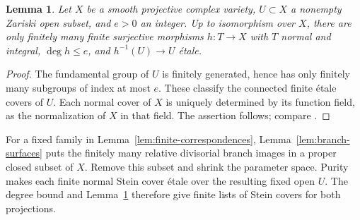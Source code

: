 \documentclass[12pt,a4paper,psamsfonts]{amsart}
\theoremstyle{definition}
\theoremstyle{plain}
\newtheorem{lemma}{Lemma}[section]
\begin{document}
\begin{lemma}\label{lem:finite-stein-covers}
Let $X$ be a smooth projective complex variety, $U\subset X$ a
nonempty Zariski open subset, and $e>0$ an integer. Up to isomorphism
over $X$, there are only finitely many finite surjective morphisms
$h:T\to X$ with $T$ normal and integral, $\deg h\le e$, and
$h^{-1}(U)\to U$ \'etale.
\end{lemma}
\begin{proof}
The fundamental group of $U$ is finitely generated, hence has
only finitely many subgroups of index at most $e$. These classify
the connected finite \'etale covers of $U$. Each normal cover of
$X$ is uniquely determined by its function field, as the normalization
of $X$ in that field. The assertion follows; compare
\cite[Lemma~7.5]{LA}.
\end{proof}

For a fixed family in Lemma~\ref{lem:finite-correspondences},
Lemma~\ref{lem:branch-surfaces} puts the finitely many relative
divisorial branch images in a proper closed subset of $X$.
Remove this subset and shrink the parameter space. Purity makes
each finite normal Stein cover \'etale over the resulting fixed open
$U$. The degree bound and Lemma~\ref{lem:finite-stein-covers} therefore
give finite lists of Stein covers for both projections.
\end{document}
